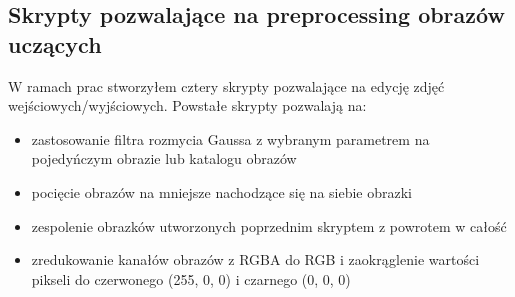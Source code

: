 \documentclass{article}
\begin{document}
\subsection{Skrypty pozwalające na preprocessing obrazów uczących}
W ramach prac stworzyłem cztery skrypty pozwalające na edycję zdjęć wejściowych/wyjściowych.
Powstałe skrypty pozwalają na:
\begin{itemize}
    \item zastosowanie filtra rozmycia Gaussa z wybranym parametrem na pojedyńczym obrazie lub katalogu obrazów
    \item pocięcie obrazów na mniejsze nachodzące się na siebie obrazki
    \item zespolenie obrazków utworzonych poprzednim skryptem z powrotem w całość
    \item zredukowanie kanałów obrazów z RGBA do RGB i zaokrąglenie wartości pikseli do czerwonego (255, 0, 0) i czarnego (0, 0, 0)
\end{itemize}
\end{document}
